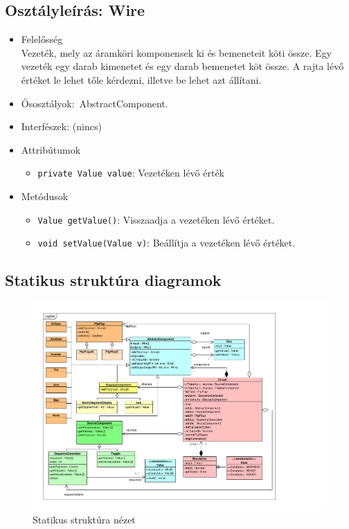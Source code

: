 \subsection{Osztályleírás: \bf Wire}
\begin{itemize}
\item Felelősség\\
Vezeték, mely az áramköri komponensek ki és bemeneteit köti össze. Egy vezeték egy darab kimenetet és egy darab bemenetet köt össze. A rajta lévő értéket le lehet tőle kérdezni, illetve be lehet azt állítani.
\item Ősosztályok:\ AbstractComponent.
\item Interfészek: (nincs)
\item Attribútumok $\ $
\begin{itemize}
	\item \texttt{private Value value}: Vezetéken lévő érték
\end{itemize}
\item Metódusok$\ $
\begin{itemize}
	\item \texttt{Value getValue()}: Visszaadja a vezetéken lévő értéket.
	\item \texttt{void setValue(Value v)}: Beállítja a vezetéken lévő értéket.
\end{itemize}
\end{itemize}

\subsection{Statikus struktúra diagramok}

\begin{figure}[H]
\begin{center}
\includegraphics*[angle=90, width=17cm, viewport = 25 30 705 565]{chapters/chapter04/classdiagram/class.pdf}
\caption{Statikus struktúra nézet}
\label{fig:class_diagram}
\end{center}
\end{figure}

